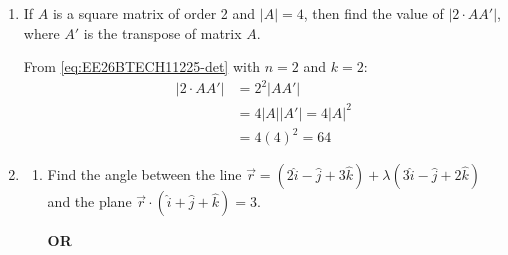 \begin{enumerate}[label=\thesubsection.\arabic*, ref=\thesubsection.\theenumi]

    \item If $A$ is a square matrix of order 2 and $|A| = 4$, then find the value of $|2 \cdot AA'|$, where $A'$ is the transpose of matrix $A$.

\solution From \eqref{eq:EE26BTECH11225-det} with $n=2$ and $k=2$:
\begin{align}
    |2 \cdot AA'| &= 2^2 |AA'| \\
    &= 4|A||A'| = 4|A|^2 \\
    &= 4(4)^2 = 64
\end{align}

    \item
    \begin{enumerate}[label=(\alph*), leftmargin=1.5em, labelsep=0.5em]
        \item Find the angle between the line $\vec{r} = (2\hat{i} - \hat{j} + 3\hat{k}) + \lambda(3\hat{i} - \hat{j} + 2\hat{k})$ and the plane $\vec{r}\cdot(\hat{i}+\hat{j}+\hat{k}) = 3$.

        \begin{center}
            \textbf{OR}
        \end{center}


\end{enumerate}
\end{enumerate}
